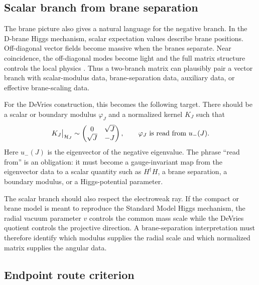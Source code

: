 \subsection{Scalar branch from brane separation}
\label{sec:brane-scalar-branch}

The brane picture also gives a natural language for the negative branch.  In the D-brane Higgs mechanism, scalar expectation values describe brane positions.  Off-diagonal vector fields become massive when the branes separate.  Near coincidence, the off-diagonal modes become light and the full matrix structure controls the local physics \cite{TongString}.  Thus a two-branch matrix can plausibly pair a vector branch with scalar-modulus data, brane-separation data, auxiliary data, or effective brane-scaling data.

For the DeVries construction, this becomes the following target.  There should be a scalar or boundary modulus \(\varphi_J\) and a normalized kernel \(K_J\) such that
\begin{equation}
  K_J\big|_{\mathcal H_J}
  \sim
  \begin{pmatrix}
  0 & \sqrt J\\
  \sqrt J & -J
  \end{pmatrix},
  \qquad
  \varphi_J\ \hbox{is read from}\ u_-(J).
  \label{eq:brane-negative-branch-target}
\end{equation}
Here \(u_-(J)\) is the eigenvector of the negative eigenvalue.  The phrase ``read from'' is an obligation: it must become a gauge-invariant map from the eigenvector data to a scalar quantity such as \(H^\dagger H\), a brane separation, a boundary modulus, or a Higgs-potential parameter.

The scalar branch should also respect the electroweak ray.  If the compact or brane model is meant to reproduce the Standard Model Higgs mechanism, the radial vacuum parameter \(v\) controls the common mass scale while the DeVries quotient controls the projective direction.  A brane-separation interpretation must therefore identify which modulus supplies the radial scale and which normalized matrix supplies the angular data.

\subsection{Endpoint route criterion}
\label{sec:endpoint-completion-criterion}

